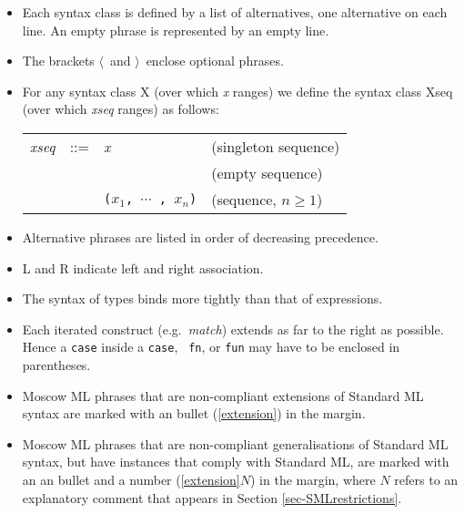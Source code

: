 \documentclass[fleqn,a4paper]{article}
\newcounter{extension}
\newcommand{\x}[1][]{\ref{extension}{#1}}
\newcommand{\la}{$\langle$}
\newcommand{\ra}{$\rangle$}
\begin{document}
\begin{itemize}
\item Each syntax class is defined by a list of alternatives, one
  alternative on each line.  An empty phrase is represented by an
  empty line.

\item The brackets \la\ and \ra\ enclose optional phrases.

\item For any syntax class X (over which {\it x\/} ranges) we define the syntax
  class Xseq (over which {\it xseq\/} ranges) as follows:

  \begin{center}
    \begin{tabular}{llll}
      {\it xseq\/} &  ::=  & {\it x\/} & (singleton sequence)\\
             &       &           & (empty sequence)\\
             &       & {\tt ($x_1$, $\cdots$ , $x_n$)} & (sequence,
             $n\geq 1$)
    \end{tabular}
  \end{center}
\item Alternative phrases are listed in order of decreasing precedence.

\item L and R indicate left and right association.

\item The syntax of types binds more tightly than that of expressions.

\item Each iterated construct (e.g.\ {\it match\/}) extends as far to
  the right as possible.  Hence a {\tt case} inside a {\tt case}, {\tt
    fn}, or {\tt fun} may have to be enclosed in parentheses.

\item Moscow ML phrases that are non-compliant 
      extensions of Standard ML syntax are
      marked with an bullet (\x) in the margin.
      
    \item Moscow ML phrases that are non-compliant generalisations of
      Standard ML syntax, but have instances that comply with Standard
      ML, are marked with an an bullet and a number (\x[$N$]) in the
      margin, where $N$ refers to an explanatory comment that appears
      in Section \ref{sec-SMLrestrictions}.
\end{itemize}

\newpage
\end{document}
